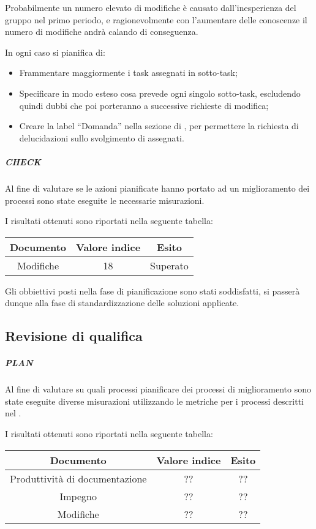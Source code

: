 Probabilmente un numero elevato di modifiche è causato dall'inesperienza del gruppo nel primo periodo, e ragionevolmente con l'aumentare delle conoscenze il numero di modifiche andrà calando di conseguenza. 

In ogni caso si pianifica di:
\begin{itemize}
\item Frammentare maggiormente i task assegnati in sotto-task;
\item Specificare in modo esteso cosa prevede ogni singolo sotto-task, escludendo quindi dubbi che poi porteranno a successive richieste di modifica;
\item Creare la label ``Domanda'' nella sezione  di , per permettere la richiesta di delucidazioni sullo svolgimento di  assegnati.
\end{itemize}
  
\subparagraph{CHECK}

Al fine di valutare se le azioni pianificate hanno portato ad un miglioramento dei processi sono state eseguite le necessarie misurazioni.

I risultati ottenuti sono riportati nella seguente tabella:

\begin{tabular}{ | c | c | c | }
\hline
Documento & Valore indice & Esito \\
\hline
Modifiche & 18 & Superato \\
\hline
\end{tabular}

Gli obbiettivi posti nella fase di pianificazione sono stati soddisfatti, si passerà dunque alla fase di standardizzazione delle soluzioni applicate. 

\subsection{Revisione di qualifica}

\subparagraph{PLAN}

Al fine di valutare su quali processi pianificare dei processi di miglioramento sono state eseguite diverse misurazioni utilizzando le metriche per i processi descritti nel \PianoDiQualifica.

I risultati ottenuti sono riportati nella seguente tabella:


\begin{tabular}{ | c | c | c | }
\hline
Documento & Valore indice & Esito \\
\hline
Produttività di documentazione & ?? & ?? \\
\hline
Impegno & ?? & ?? \\
\hline
Modifiche & ?? & ?? \\
\hline
\end{tabular}

